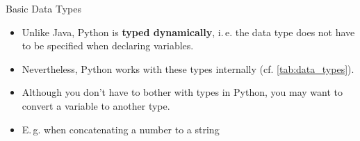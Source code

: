 
\begin{dwHeaderFrame}{Basic Data Types}
	\begin{itemize}
		\item Unlike Java, Python is \textbf{typed dynamically}, i.\,e. the data type does not have to be specified when declaring variables.
		\item Nevertheless, Python works with these types internally (cf. \cref{tab:data_types}).
	\end{itemize}
	
	
\end{dwHeaderFrame}


\begin{frame}
	
\end{frame}


\begin{frame}{}
	\begin{itemize}
		\item Although you don't have to bother with types in Python, you may want to convert a variable to another type.
		\item E.\,g. when concatenating a number to a string
	\end{itemize}
	
	
\end{frame}


\begin{frame}
	
\end{frame}



